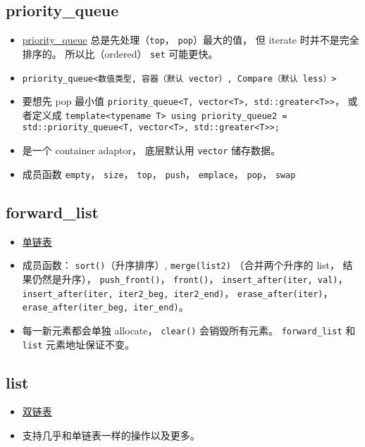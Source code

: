 \subsection{priority\_queue}
\begin{itemize}
\item \href{https://cplusplus.com/reference/queue/priority_queue/}{priority\_queue} 总是先处理（\verb`top`， \verb`pop`）最大的值， 但 iterate 时并不是完全排序的。 所以比（ordered） \verb`set` 可能更快。
\item \verb`priority_queue<数值类型, 容器（默认 vector）, Compare（默认 less）>`
\item 要想先 pop 最小值 \verb`priority_queue<T, vector<T>, std::greater<T>>`， 或者定义成 \verb`template<typename T> using priority_queue2 = std::priority_queue<T, vector<T>, std::greater<T>>;`
\item 是一个 container adaptor， 底层默认用 \verb`vector` 储存数据。
\item 成员函数 \verb`empty`， \verb`size`， \verb`top`， \verb`push`， \verb`emplace`， \verb`pop`， \verb`swap`
\end{itemize}


\subsection{forward\_list}
\begin{itemize}
\item \href{https://cplusplus.com/reference/forward_list/forward_list/}{单链表}
\item 成员函数： \verb`sort()`（升序排序）, \verb`merge(list2)` （合并两个升序的 list， 结果仍然是升序）， \verb`push_front()`， \verb`front()`， \verb`insert_after(iter, val)`，  \verb`insert_after(iter, iter2_beg, iter2_end)`， \verb`erase_after(iter)`， \verb`erase_after(iter_beg, iter_end)`。
\item 每一新元素都会单独 allocate， \verb`clear()` 会销毁所有元素。 \verb`forward_list` 和 \verb`list` 元素地址保证不变。
\end{itemize}

\subsection{list}
\begin{itemize}
\item \href{https://cplusplus.com/reference/list/list/}{双链表}
\item 支持几乎和单链表一样的操作以及更多。
\end{itemize}
